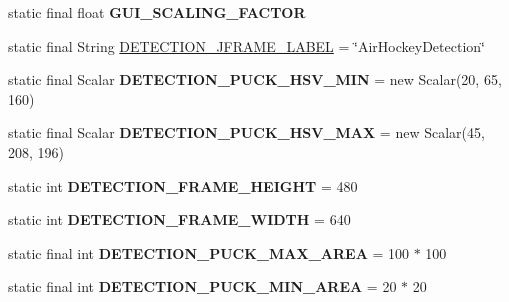 \begin{DoxyCompactItemize}
\item 
static final float {\bfseries G\+U\+I\+\_\+\+S\+C\+A\+L\+I\+N\+G\+\_\+\+F\+A\+C\+T\+O\+R}
\item 
static final String \hyperlink{classairhockeyjava_1_1game_1_1_constants_a8a848f6d39f4b63e53885ba0f79d0673}{D\+E\+T\+E\+C\+T\+I\+O\+N\+\_\+\+J\+F\+R\+A\+M\+E\+\_\+\+L\+A\+B\+E\+L} = \char`\"{}Air\+Hockey\+Detection\char`\"{}
\item 
\hypertarget{classairhockeyjava_1_1game_1_1_constants_a52dd35d4c46f7849784116bdcca113c0}{}static final Scalar {\bfseries D\+E\+T\+E\+C\+T\+I\+O\+N\+\_\+\+P\+U\+C\+K\+\_\+\+H\+S\+V\+\_\+\+M\+I\+N} = new Scalar(20, 65, 160)\label{classairhockeyjava_1_1game_1_1_constants_a52dd35d4c46f7849784116bdcca113c0}

\item 
\hypertarget{classairhockeyjava_1_1game_1_1_constants_a4a37612b12720539324018716c35bdc1}{}static final Scalar {\bfseries D\+E\+T\+E\+C\+T\+I\+O\+N\+\_\+\+P\+U\+C\+K\+\_\+\+H\+S\+V\+\_\+\+M\+A\+X} = new Scalar(45, 208, 196)\label{classairhockeyjava_1_1game_1_1_constants_a4a37612b12720539324018716c35bdc1}

\item 
\hypertarget{classairhockeyjava_1_1game_1_1_constants_aa52da4b84020bf92cce15ce3ce560c35}{}static int {\bfseries D\+E\+T\+E\+C\+T\+I\+O\+N\+\_\+\+F\+R\+A\+M\+E\+\_\+\+H\+E\+I\+G\+H\+T} = 480\label{classairhockeyjava_1_1game_1_1_constants_aa52da4b84020bf92cce15ce3ce560c35}

\item 
\hypertarget{classairhockeyjava_1_1game_1_1_constants_a109c806aab3bf14ed03ee53f426d092d}{}static int {\bfseries D\+E\+T\+E\+C\+T\+I\+O\+N\+\_\+\+F\+R\+A\+M\+E\+\_\+\+W\+I\+D\+T\+H} = 640\label{classairhockeyjava_1_1game_1_1_constants_a109c806aab3bf14ed03ee53f426d092d}

\item 
\hypertarget{classairhockeyjava_1_1game_1_1_constants_a0cfc24da6689424680ffdba8e9287bbb}{}static final int {\bfseries D\+E\+T\+E\+C\+T\+I\+O\+N\+\_\+\+P\+U\+C\+K\+\_\+\+M\+A\+X\+\_\+\+A\+R\+E\+A} = 100 $\ast$ 100\label{classairhockeyjava_1_1game_1_1_constants_a0cfc24da6689424680ffdba8e9287bbb}

\item 
\hypertarget{classairhockeyjava_1_1game_1_1_constants_a4c9ff386828b965f4af495416b828c54}{}static final int {\bfseries D\+E\+T\+E\+C\+T\+I\+O\+N\+\_\+\+P\+U\+C\+K\+\_\+\+M\+I\+N\+\_\+\+A\+R\+E\+A} = 20 $\ast$ 20\label{classairhockeyjava_1_1game_1_1_constants_a4c9ff386828b965f4af495416b828c54}


\end{DoxyCompactItemize}
